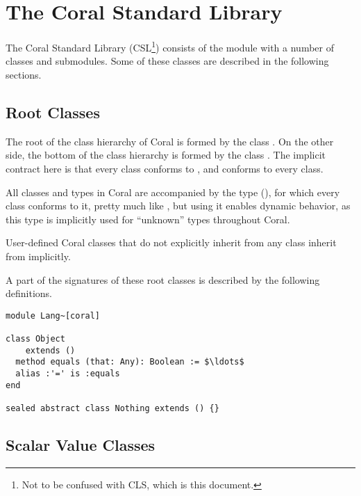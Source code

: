 
\chapter{The Coral Standard Library}

The Coral Standard Library (CSL\footnote{Not to be confused with CLS, which is this document.}) consists of the module  with a number of classes and submodules. Some of these classes are described in the following sections. 

\section{Root Classes}
\label{sec:root-classes}

The root of the class hierarchy of Coral is formed by the class . On the other side, the bottom of the class hierarchy is formed by the class . The implicit contract here is that every class conforms to , and  conforms to every class. 

All classes and types in Coral are accompanied by the  type (), for which every class conforms to it, pretty much like , but using it enables dynamic behavior, as this type is implicitly used for ``unknown'' types throughout Coral. 

User-defined Coral classes that do not explicitly inherit from any class inherit from  implicitly. 

A part of the signatures of these root classes is described by the following definitions. 

\begin{lstlisting}
module Lang~[coral]

class Object 
    extends ()
  method equals (that: Any): Boolean := $\ldots$
  alias :'=' is :equals
end

sealed abstract class Nothing extends () {}
\end{lstlisting}






\section{Scalar Value Classes}
\label{sec:scalar-value-classes}






